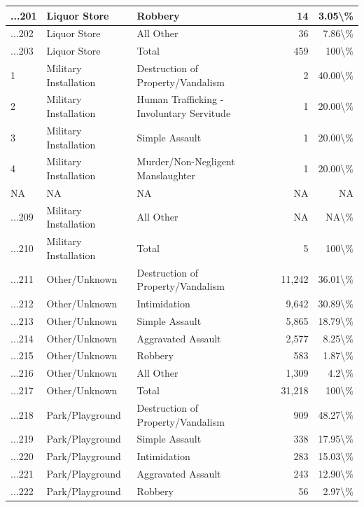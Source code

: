 \documentclass[
]{krantz}
\begin{document}
\begin{longtable}[t]{l|l|l|r|r}
\hline
...201 & Liquor Store & Robbery & 14 & 3.05\textbackslash{}\%\\
\hline
...202 & Liquor Store & All Other & 36 & 7.86\textbackslash{}\%\\
\hline
...203 & Liquor Store & Total & 459 & 100\textbackslash{}\%\\
\hline
1 & Military Installation & Destruction of Property/Vandalism & 2 & 40.00\textbackslash{}\%\\
\hline
2 & Military Installation & Human Trafficking - Involuntary Servitude & 1 & 20.00\textbackslash{}\%\\
\hline
3 & Military Installation & Simple Assault & 1 & 20.00\textbackslash{}\%\\
\hline
4 & Military Installation & Murder/Non-Negligent Manslaughter & 1 & 20.00\textbackslash{}\%\\
\hline
NA & NA & NA & NA & NA\\
\hline
...209 & Military Installation & All Other & NA & NA\textbackslash{}\%\\
\hline
...210 & Military Installation & Total & 5 & 100\textbackslash{}\%\\
\hline
...211 & Other/Unknown & Destruction of Property/Vandalism & 11,242 & 36.01\textbackslash{}\%\\
\hline
...212 & Other/Unknown & Intimidation & 9,642 & 30.89\textbackslash{}\%\\
\hline
...213 & Other/Unknown & Simple Assault & 5,865 & 18.79\textbackslash{}\%\\
\hline
...214 & Other/Unknown & Aggravated Assault & 2,577 & 8.25\textbackslash{}\%\\
\hline
...215 & Other/Unknown & Robbery & 583 & 1.87\textbackslash{}\%\\
\hline
...216 & Other/Unknown & All Other & 1,309 & 4.2\textbackslash{}\%\\
\hline
...217 & Other/Unknown & Total & 31,218 & 100\textbackslash{}\%\\
\hline
...218 & Park/Playground & Destruction of Property/Vandalism & 909 & 48.27\textbackslash{}\%\\
\hline
...219 & Park/Playground & Simple Assault & 338 & 17.95\textbackslash{}\%\\
\hline
...220 & Park/Playground & Intimidation & 283 & 15.03\textbackslash{}\%\\
\hline
...221 & Park/Playground & Aggravated Assault & 243 & 12.90\textbackslash{}\%\\
\hline
...222 & Park/Playground & Robbery & 56 & 2.97\textbackslash{}\%\\

\end{longtable}
\end{document}
